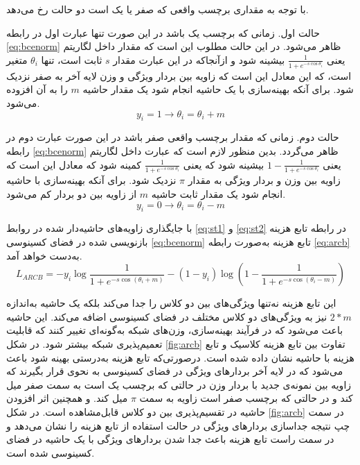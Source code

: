 با توجه به مقداری برچسب واقعی  که صفر یا یک است دو حالت رخ می‌دهد.

حالت اول. زمانی که برچسب یک باشد در این صورت تنها عبارت اول در رابطه 
\ref{eq:bcenorm}
 ظاهر می‌شود. در این حالت مطلوب این است که مقدار داخل لگاریتم یعنی 
 $\frac{1}{1+e^{-s\cos{\theta_i}}}$
 بیشینه شود و ازآنجاکه در این عبارت مقدار  
$s$
ثابت است، تنها 
$\theta_i$
متغیر است، که این معادل این است که زاویه بین بردار ویژگی و وزن لایه آخر به صفر نزدیک شود. برای آنکه بهینه‌سازی با یک حاشیه انجام شود یک مقدار حاشیه $m$ را به آن افزوده می‌شود.
  \begin{equation}\label{eq:st1}
 	y_i=1 \to \theta_i= \theta_i + m
 \end{equation}

حالت دوم. زمانی که مقدار برچسب واقعی صفر باشد در این صورت عبارت دوم در رابطه 
\ref{eq:bcenorm}
 ظاهر می‌گردد. بدین منظور لازم است که عبارت داخل لگاریتم یعنی
 $1-\frac{1}{1+e^{-s\cos{\theta_i}}}$
 بیشینه شود که یعنی  
  $\frac{1}{1+e^{-s\cos{\theta_i}}}$
 کمینه شود که معادل این است که زاویه بین وزن و بردار ویژگی به مقدار 
$\pi$
  نزدیک شود. برای آنکه بهینه‌سازی با حاشیه انجام شود یک مقدار ثابت حاشیه $m$ از زاویه بین دو بردار کم می‌شود.
   \begin{equation}\label{eq:st2}
 	y_i=0 \to \theta_i= \theta_i - m
 \end{equation}

با جایگذاری زاویه‌های حاشیه‌دار شده در روابط 
\ref{eq:st1}
 و 
 \ref{eq:st2}
 در رابطه تابع هزینه  بازنویسی شده در فضای کسینوسی 
 \ref{eq:bcenorm}
 تابع هزینه  به‌صورت رابطه
\ref{eq:arcb}
  به‌دست خواهد آمد.
\begin{equation}\label{eq:arcb}
	L_{ARCB} = -y_i \log{\frac{1}{1+e^{-s\cos{(\theta_i+m)}}}} - (1-y_i)\log{(1-\frac{1}{1+e^{-s\cos{(\theta_i-m)}}} )}
\end{equation}

این تابع هزینه نه‌تنها ویژگی‌های بین دو کلاس را جدا می‌کند بلکه یک حاشیه به‌اندازه  
$2*m$
نیز به ویژگی‌های دو کلاس مختلف در فضای کسینوسی اضافه می‌کند. این حاشیه باعث می‌شود که در فرآیند بهینه‌سازی، وزن‌های شبکه به‌گونه‌ای تغییر کنند که قابلیت تعمیم‌پذیری شبکه بیشتر شود.
در شکل
\ref{fig:arcb}
تفاوت بین تابع هزینه کلاسیک و تابع هزینه با حاشیه نشان داده شده است. در‌صورتی‌که تابع هزینه به‌درستی بهینه شود باعث می‌شود که در لایه آخر بردارهای ویژگی در فضای کسینوسی به نحوی قرار بگیرند که زاویه بین نمونه‌ی جدید با بردار وزن در حالتی که برچسب یک است به سمت صفر میل کند و در حالتی که برچسب صفر است زاویه به سمت
$\pi$ 
 میل کند. و همچنین اثر افزودن حاشیه در تقسیم‌پذیری بین دو کلاس قابل‌مشاهده است. در شکل
\ref{fig:arcb}
در سمت چپ نتیجه جداسازی بردارهای ویژگی در حالت استفاده از تابع هزینه  را نشان می‌دهد و در سمت راست تابع هزینه  باعث جدا شدن بردارهای ویژگی با یک حاشیه در فضای کسینوسی شده است. 
		
